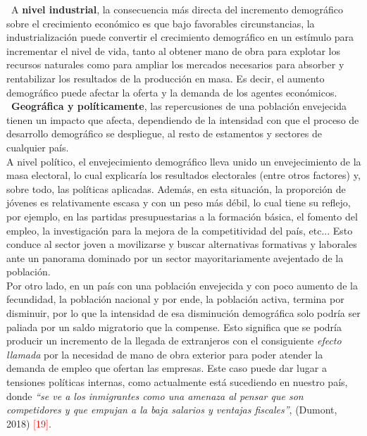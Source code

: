 \vspace{-0.2cm}
\noindent \textbullet\ A \textbf{nivel industrial}, la consecuencia m\'as directa del incremento demogr\'afico sobre el crecimiento econ\'omico es que bajo favorables circunstancias, la industrializaci\'on puede convertir el crecimiento demogr\'afico en un est\'imulo para incrementar el nivel de vida, tanto al obtener mano de obra para explotar los recursos naturales como para ampliar los mercados necesarios para absorber y rentabilizar los resultados de la producci\'on en masa. Es decir, el aumento demogr\'afico puede afectar la oferta y la demanda de los agentes econ\'omicos.\\

\vspace{-0.2cm}
\noindent \textbullet\ \textbf{Geogr\'afica y pol\'iticamente}, las repercusiones de una poblaci\'on envejecida tienen un impacto que afecta, dependiendo de la intensidad con que el proceso de desarrollo demogr\'afico se despliegue, al resto de estamentos y sectores de cualquier pa\'is.\\
A nivel pol\'itico, el envejecimiento demogr\'afico lleva unido un envejecimiento de la masa electoral, lo cual explicar\'ia los resultados electorales (entre otros factores) y, sobre todo, las pol\'iticas aplicadas. Adem\'as, en esta situaci\'on, la proporci\'on de j\'ovenes es relativamente escasa y con un peso m\'as d\'ebil, lo cual tiene su reflejo, por ejemplo, en las partidas presupuestarias a la formaci\'on b\'asica, el fomento del empleo, la investigaci\'on para la mejora de la competitividad del pa\'is, etc... Esto conduce al sector joven a movilizarse y buscar alternativas formativas y laborales ante un panorama dominado por un sector mayoritariamente avejentado de la poblaci\'on.\\

\vspace{-0.2cm}
Por otro lado, en un pa\'is con una poblaci\'on envejecida y con poco aumento de la fecundidad, la poblaci\'on nacional y por ende, la poblaci\'on activa, termina por disminuir, por lo que la intensidad de esa disminuci\'on demogr\'afica solo podr\'ia ser paliada por un saldo migratorio que la compense. Esto significa que se podr\'ia producir un incremento de la llegada de extranjeros con el consiguiente \textit{efecto llamada} por la necesidad de mano de obra exterior para poder atender la demanda de empleo que ofertan las empresas. Este caso puede dar lugar a tensiones pol\'iticas internas, como actualmente est\'a sucediendo en nuestro pa\'is, donde \textit{``se ve a los inmigrantes como una amenaza al pensar que son competidores y que empujan a la baja salarios y ventajas fiscales''}, (Dumont, 2018) \textcolor{red}{[19]}.

